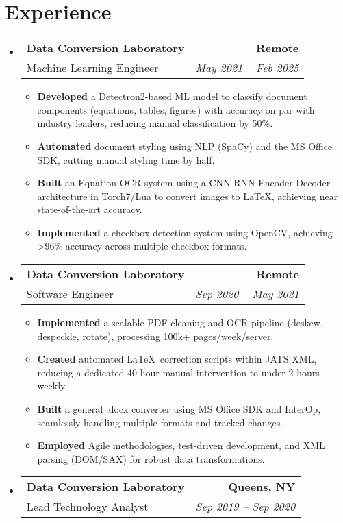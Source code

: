 \documentclass[a4paper]{article}
\makeatletter
\newcommand{\TwoRowSubheading}[4]{
  \item \begin{tabular*}{.95\textwidth}{@{}l @{\extracolsep{\fill}} r@{}}
    \textbf{#1} & \textbf{#2} \\
    {\color{gray}#3} & {\itshape #4} \\
  \end{tabular*}
}
\makeatother
\begin{document}
\section{Experience}
\begin{itemize}[leftmargin=*,label=]

\TwoRowSubheading
{Data Conversion Laboratory}
{Remote}
{Machine Learning Engineer}
{May 2021 -- Feb 2025}

\begin{itemize}[leftmargin=1em,rightmargin=1em,label=]
    \item \textbf{Developed} a Detectron2-based ML model to classify document components (equations, tables, figures) with accuracy on par with industry leaders, reducing manual classification by 50\%.
    \item \textbf{Automated} document styling using NLP (SpaCy) and the MS Office SDK, cutting manual styling time by half.
    \item \textbf{Built} an Equation OCR system using a CNN-RNN Encoder-Decoder architecture in Torch7/Lua to convert images to \LaTeX, achieving near state-of-the-art accuracy.
    \item \textbf{Implemented} a checkbox detection system using OpenCV, achieving >96\% accuracy across multiple checkbox formats.
\end{itemize}

\TwoRowSubheading
{Data Conversion Laboratory}
{Remote}
{Software Engineer}
{Sep 2020 -- May 2021}

\begin{itemize}[leftmargin=1em,rightmargin=1em,label=]
    \item \textbf{Implemented} a scalable PDF cleaning and OCR pipeline (deskew, despeckle, rotate), processing 100k+ pages/week/server.
    \item \textbf{Created} automated \LaTeX\ correction scripts within JATS XML, reducing a dedicated 40-hour manual intervention to under 2 hours weekly.
    \item \textbf{Built} a general .docx converter using MS Office SDK and InterOp, seamlessly handling multiple formats and tracked changes.
    \item \textbf{Employed} Agile methodologies, test-driven development, and XML parsing (DOM/SAX) for robust data transformations.
\end{itemize}

\TwoRowSubheading
{Data Conversion Laboratory}
{Queens, NY}
{Lead Technology Analyst}
{Sep 2019 -- Sep 2020}


\end{itemize}
\end{document}
